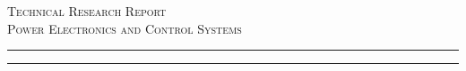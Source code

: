 %
%      
%

\providecommand{\DocCategory}{Technical Research Report}
\providecommand{\DocField}{Power Electronics and Control Systems}
\providecommand{\DocSubtitle}{}
\providecommand{\DocRevision}{00}
\providecommand{\DocAbstract}{}
\providecommand{\RevisionHistory}{%
	\DocRevision & \DocDate & First issue. & \DocAuthor \\
}

\titlepage

\begin{center}
	{\Large\scshape \DocCategory}\\[8pt]
	{\large\scshape \DocField}
\end{center}

\vspace{30pt plus 4pt minus 14pt}
\noindent\rule{\linewidth}{0.8pt}

\begin{center}
	\DocTitle
\end{center}

\vspace{4pt}
\noindent\rule{\linewidth}{2.2pt}

\begin{center}
	\begin{onehalfspace}
		{\large\itshape \DocSubtitle}
	\end{onehalfspace}
\end{center}

\vspace{30pt plus 4pt minus 14pt}

